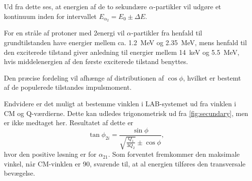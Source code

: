 Ud fra dette ses, at energien af de to sekundære $\alpha$-partikler vil udgøre et kontinuum inden for
intervallet $E_{\alpha_{2}} = E_{0} \pm \Delta E$.

For en stråle af protoner med 2\MeV energi vil $\alpha$-partikler fra henfald til grundtilstanden have
energier mellem ca. \SI{1.2}{\MeV} og \SI{2.35}{\MeV}, mens henfald til den exciterede tilstand
giver anledning til energier mellem \SI{14}{\keV} og \SI{5.5}{\MeV}, hvis middelenergien af den
første exciterede tilstand benyttes.

Den præcise fordeling vil afhænge af distributionen af $\cos \phi$, hvilket er bestemt af de populerede
tilstandes impulsmoment. 

Endvidere er det muligt at bestemme vinklen i LAB-systemet ud fra vinklen i CM og Q-værdierne. Dette
kan udledes trigonometrisk ud fra \cref{fig:secundary}, men er ikke medtaget her. Resultatet af dette
er
\begin{equation}
  \label{eq:sekv-vinkel}
  \tan \phi_{2i} = \frac{\sin \phi}{\sqrt{\frac{Q_{1}}{3Q_{2}}} \pm \cos \phi},
\end{equation}
hvor den positive løsning er for $\alpha_{21}$. Som forventet fremkommer den maksimale vinkel, når
CM-vinklen er 90\degree, svarende til, at al energien tilføres den transversale bevægelse.
